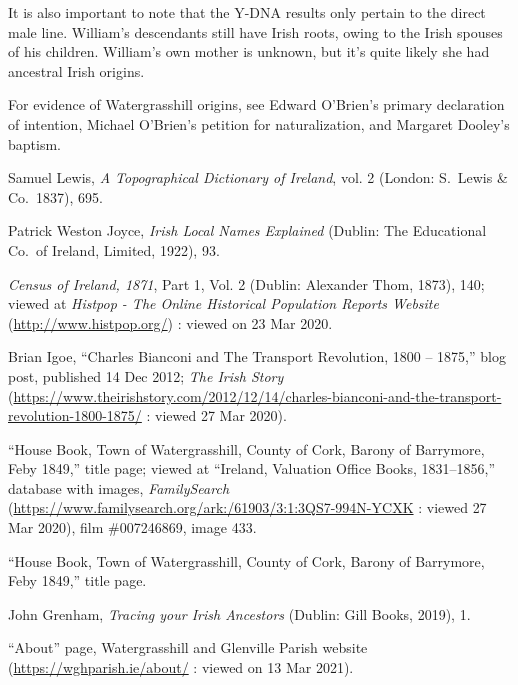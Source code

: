 It is also important to note that the Y-DNA results only pertain to the direct male line. William's descendants still have Irish roots, owing to the Irish spouses of his children. William's own mother is unknown, but it's quite likely she had ancestral Irish origins.

\begin{thebibliography}{999}

For evidence of Watergrasshill origins, see Edward O'Brien's primary declaration of intention, Michael O'Brien's petition for naturalization, and Margaret Dooley's baptism.

Samuel Lewis, \textit{A Topographical Dictionary of Ireland}, vol. 2 (London: S.\ Lewis \& Co.\, 1837), 695.

Patrick Weston Joyce, \textit{Irish Local Names Explained} (Dublin: The Educational Co.\ of Ireland, Limited, 1922), 93.

\textit{Census of Ireland, 1871}, Part 1, Vol. 2 (Dublin: Alexander Thom, 1873), 140; viewed at \textit{Histpop - The Online Historical Population Reports Website} (\url{http://www.histpop.org/}) : viewed on 23 Mar 2020.

Brian Igoe, ``Charles Bianconi and The Transport Revolution, 1800 -- 1875,'' blog post, published 14 Dec 2012; \textit{The Irish Story} (\url{https://www.theirishstory.com/2012/12/14/charles-bianconi-and-the-transport-revolution-1800-1875/} : viewed 27 Mar 2020).

``House Book, Town of Watergrasshill, County of Cork, Barony of Barrymore, Feby 1849,'' title page; viewed at ``Ireland, Valuation Office Books, 1831--1856,'' database with images, \textit{FamilySearch} (\url{https://www.familysearch.org/ark:/61903/3:1:3QS7-994N-YCXK} : viewed 27 Mar 2020), film \#007246869, image 433.

``House Book, Town of Watergrasshill, County of Cork, Barony of Barrymore, Feby 1849,'' title page.

John Grenham, \textit{Tracing your Irish Ancestors} (Dublin: Gill Books, 2019), 1.

``About'' page, Watergrasshill and Glenville Parish website (\url{https://wghparish.ie/about/} : viewed on 13 Mar 2021). 


\end{thebibliography}

